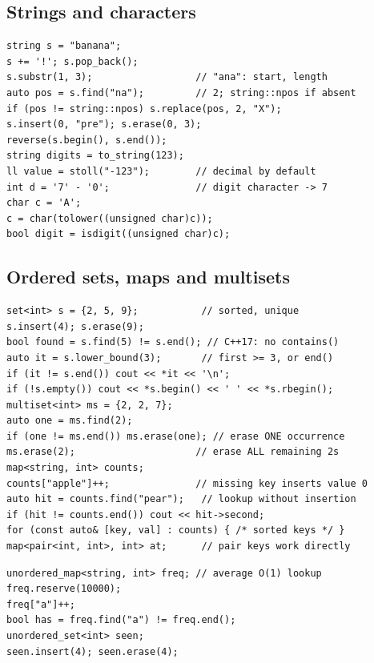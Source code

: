\subsection{Strings and characters}\label{cpp:strings}
\begin{lstlisting}[style=cpp]
string s = "banana";
s += '!'; s.pop_back();
s.substr(1, 3);                  // "ana": start, length
auto pos = s.find("na");         // 2; string::npos if absent
if (pos != string::npos) s.replace(pos, 2, "X");
s.insert(0, "pre"); s.erase(0, 3);
reverse(s.begin(), s.end());
string digits = to_string(123);
ll value = stoll("-123");        // decimal by default
int d = '7' - '0';               // digit character -> 7
char c = 'A';
c = char(tolower((unsigned char)c));
bool digit = isdigit((unsigned char)c);
\end{lstlisting}

\subsection{Ordered sets, maps and multisets}
\begin{lstlisting}[style=cpp]
set<int> s = {2, 5, 9};           // sorted, unique
s.insert(4); s.erase(9);
bool found = s.find(5) != s.end(); // C++17: no contains()
auto it = s.lower_bound(3);       // first >= 3, or end()
if (it != s.end()) cout << *it << '\n';
if (!s.empty()) cout << *s.begin() << ' ' << *s.rbegin();
multiset<int> ms = {2, 2, 7};
auto one = ms.find(2);
if (one != ms.end()) ms.erase(one); // erase ONE occurrence
ms.erase(2);                     // erase ALL remaining 2s
map<string, int> counts;
counts["apple"]++;               // missing key inserts value 0
auto hit = counts.find("pear");   // lookup without insertion
if (hit != counts.end()) cout << hit->second;
for (const auto& [key, val] : counts) { /* sorted keys */ }
map<pair<int, int>, int> at;      // pair keys work directly
\end{lstlisting}
\begin{lstlisting}[style=cpp]
unordered_map<string, int> freq; // average O(1) lookup
freq.reserve(10000);
freq["a"]++;
bool has = freq.find("a") != freq.end();
unordered_set<int> seen;
seen.insert(4); seen.erase(4);
\end{lstlisting}

